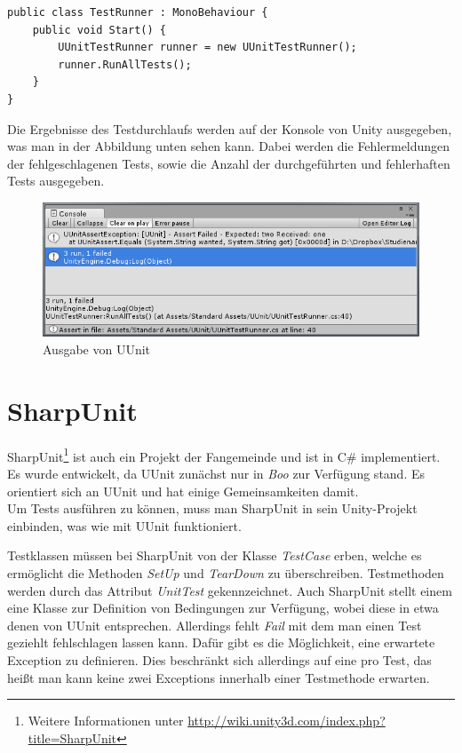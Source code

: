 \begin{lstlisting}[caption={[Beispiel um alle UUnit-Tests auszuführen]Beispiel um alle UUnit-Tests auszuführen\\
Muss an ein \textit{GameObject} angehängt werden. Beim Start des Spiels werden alle Tests ausgeführt.}, label=code:UUnitTestRunner]
public class TestRunner : MonoBehaviour {
	public void Start() {
		UUnitTestRunner runner = new UUnitTestRunner();
		runner.RunAllTests();
	}
}
\end{lstlisting}

Die Ergebnisse des Testdurchlaufs werden auf der Konsole von Unity ausgegeben, was man in der Abbildung unten sehen kann. Dabei werden die Fehlermeldungen der fehlgeschlagenen Tests, sowie die Anzahl der durchgeführten und fehlerhaften Tests ausgegeben.

\begin{figure}[h]
\centering
\includegraphics[width=1\linewidth]{./images/Kapitel_UnitTestsMitUnity/UUnit_Konsolenausgabe}
\caption[Ausgabe von UUnit]{Ausgabe von UUnit}
\label{fig:UUnit_Konsolenausgabe}
\end{figure}
\clearpage

\section{SharpUnit}\label{sec:SharpUnit}

SharpUnit\footnote{Weitere Informationen unter \url{http://wiki.unity3d.com/index.php?title=SharpUnit}} ist auch ein Projekt der Fangemeinde und ist in C\# implementiert. Es wurde entwickelt, da UUnit zunächst nur in \textit{Boo} zur Verfügung stand. Es orientiert sich an UUnit und hat einige Gemeinsamkeiten damit.\\
Um Tests ausführen zu können, muss man SharpUnit in sein Unity-Projekt einbinden, was wie mit UUnit funktioniert.

Testklassen müssen bei SharpUnit von der Klasse \textit{TestCase} erben, welche es ermöglicht die Methoden \textit{SetUp} und \textit{TearDown} zu überschreiben. Testmethoden werden durch das Attribut \textit{UnitTest} gekennzeichnet. Auch SharpUnit stellt einem eine Klasse zur Definition von Bedingungen zur Verfügung, wobei diese in etwa denen von UUnit entsprechen. Allerdings fehlt \textit{Fail} mit dem man einen Test geziehlt fehlschlagen lassen kann. Dafür gibt es die Möglichkeit, eine erwartete Exception zu definieren. Dies beschränkt sich allerdings auf eine pro Test, das heißt man kann keine zwei Exceptions innerhalb einer Testmethode erwarten.
 

